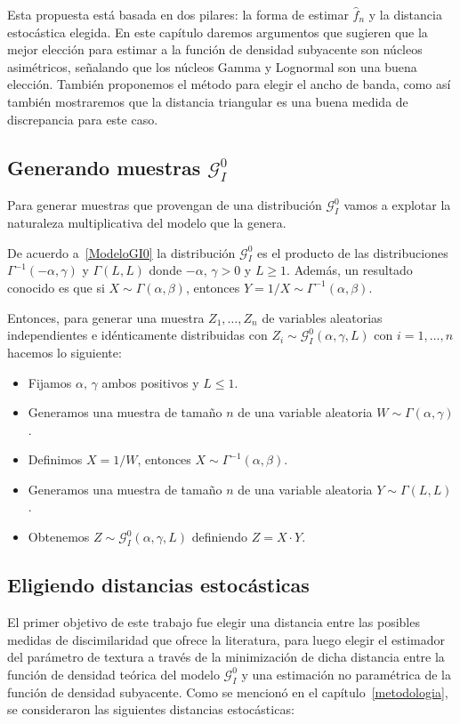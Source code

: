 Esta propuesta está basada en dos pilares: la forma de estimar $\widehat{f}_n$ y la distancia estocástica elegida. En este capítulo daremos argumentos que sugieren que la mejor elección para estimar a la función de densidad subyacente son núcleos asimétricos, señalando que los núcleos Gamma y Lognormal son una buena elección. También proponemos el método para elegir el ancho de banda, como así también mostraremos que la distancia triangular es una buena medida de discrepancia para este caso.

\subsection{Generando muestras $\mathcal{G}_I^0$}

Para generar muestras que provengan de una distribución $\mathcal{G}_I^0$ vamos a explotar la naturaleza multiplicativa del modelo que la genera.

De acuerdo a~\ref{ModeloGI0} la distribución  $\mathcal{G}_I^0$ es el producto de las distribuciones $\Gamma^{-1}(-\alpha,\gamma)$ y $\Gamma(L,L)$ donde $-\alpha, \, \gamma >0$ y $L\geq 1$. Además, un resultado conocido es que si $X \sim \Gamma(\alpha,\beta)$, entonces $Y = 1/X \sim \Gamma^{-1}(\alpha,\beta)$.

Entonces, para generar una muestra $Z_1, \ldots, Z_n$ de variables aleatorias independientes e idénticamente distribuidas con $Z_i \sim \mathcal{G}_I^0(\alpha,\gamma,L)$ con $i=1, \ldots, n$ hacemos lo siguiente:
\begin{itemize}
	\item Fijamos $\alpha, \, \gamma$ ambos positivos y $L \leq 1$.
	\item Generamos una muestra de tamaño $n$ de una variable aleatoria $W \sim \Gamma(\alpha,\gamma)$.
	\item Definimos $X=1/W$, entonces $X \sim \Gamma^{-1}(\alpha,\beta)$.
	\item Generamos una muestra de tamaño $n$ de una variable aleatoria $Y \sim \Gamma(L,L)$.
	\item Obtenemos $Z \sim \mathcal{G}_I^0(\alpha,\gamma,L)$ definiendo $Z=X \cdot Y$.
\end{itemize}


\subsection{Eligiendo distancias estocásticas}
\label{EligiendoDistancias}

El primer objetivo de este trabajo fue elegir una distancia entre las posibles medidas de discimilaridad que ofrece la literatura, para luego elegir el estimador del parámetro de textura a través de la minimización de dicha distancia entre la función de densidad teórica del modelo $\mathcal{G}_I^0$ y una estimación no paramétrica de la función de densidad subyacente. Como se mencionó en el capítulo~\ref{metodologia}, se consideraron las siguientes distancias estocásticas:

